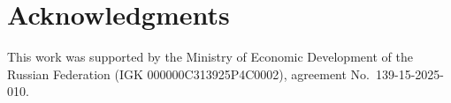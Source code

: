 \section*{Acknowledgments}
This work was supported by the Ministry of Economic Development of the Russian
Federation (IGK 000000C313925P4C0002), agreement No.~139-15-2025-010.
